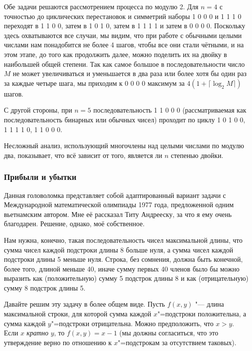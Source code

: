 \documentclass[twoside]{book}
\begin{document}
\medskip

Обе задачи решаются рассмотрением процесса по модулю 2.
Для $n=4$ с точностью до циклических перестановок и симметрий наборы
1 0 0 0 
и
1 1 1 0 переходят в
1 1 0 0, затем в
1 0 1 0, затем в
1 1 1 1 и затем в
0 0 0 0.
Поскольку здесь охватываются все случаи, мы видим, что при работе с обычными целыми числами нам понадобится не более 4 шагов, чтобы все они стали чётными, и на этом этапе, до того как продолжить далее, можно поделить их на двойку в наибольшей общей степени.
Так как самое большое в последовательности число~$M$ не может увеличиваться и уменьшается в два раза или более хотя бы один раз за каждые четыре шага, 
мы приходим к 
0 0 0 0 
максимум за $4(1+\lceil\log_2 M\rceil)$ шагов.

С другой стороны, при $n=5$ последовательность 
1 1 0 0 0
(рассматриваемая как последовательность бинарных или обычных чисел)
проходит по циклу 
1 0 1 0 0, 
1 1 1 1 0, 
1 1 0 0 0.\heart 

Несложный анализ, использующий многочлены над целыми числами по модулю два, показывает, что всё зависит от того, является ли $n$ степенью двойки.

\subsubsection*{Прибыли и убытки}%

Данная головоломка представляет собой адаптированный вариант задачи с Международной математической олимпиады 1977 года,
предложенной одним вьетнамским автором.
Мне её рассказал Титу Андрееску, %
за что я ему очень благодарен.
Решение, однако, моё собственное.

\medskip

Нам нужна, конечно, такая последовательность чисел максимальной длины, что сумма чисел каждой подстроки длины 8 больше нуля, а сумма чисел каждой подстроки длины 5 меньше нуля.
Строка, без сомнения, должна быть конечной, более того, длиной меньше 40, иначе  сумму первых 40 членов было бы можно выразить как (положительную) сумму 5 подстрок длины 8 и как (отрицательную) сумму 8 подстрок длины 5.

Давайте решим эту задачу в более общем виде.
Пусть $f(x,y)$ "--- длина максимальной строки, для которой сумма каждой $x$"=подстроки положительна, а сумма каждой $y$"=подстроки отрицательна.
Можно предположить, что $x>y$.
Если $x$ \emph{кратно} $y$, то $f(x,y)=x-1$ (мы должны согласиться, что это утверждение верно по отношению к $x$"=подстрокам за отсутствием таковых).
\end{document}
